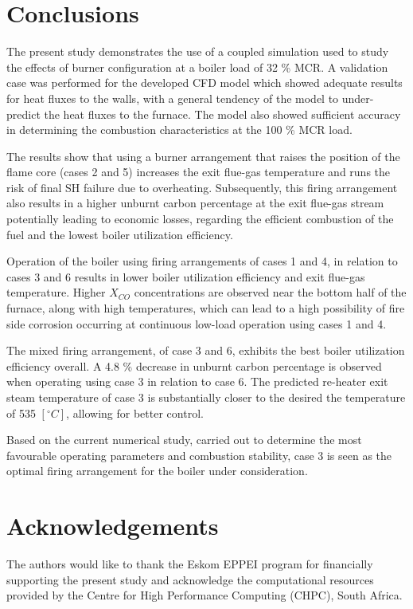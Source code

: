 \documentclass[review]{elsarticle}
\begin{document}
\clearpage
\section{Conclusions}
The present study demonstrates the use of a coupled simulation used to study the effects of burner configuration at a boiler load of 32 \% MCR. A validation case was performed for the developed CFD model which showed adequate results for heat fluxes to the walls, with a general tendency of the model to under-predict the heat fluxes to the furnace. The model also showed sufficient accuracy in determining the combustion characteristics at the 100 \% MCR load. 

The results show that using a burner arrangement that raises the position of the flame core (cases 2 and 5) increases the exit flue-gas temperature and runs the risk of final SH failure due to overheating. Subsequently, this firing arrangement also results in a higher unburnt carbon percentage at the exit flue-gas stream potentially leading to economic losses, regarding the efficient combustion of the fuel and the lowest boiler utilization efficiency.

Operation of the boiler using firing arrangements of cases 1 and 4, in relation to cases 3 and 6 results in lower boiler utilization efficiency and exit flue-gas temperature. Higher $X_{CO}$ concentrations are observed near the bottom half of the furnace, along with high temperatures, which can lead to a high possibility of fire side corrosion occurring at continuous low-load operation using cases 1 and 4.

The mixed firing arrangement, of case 3 and 6, exhibits the best boiler utilization efficiency overall. A 4.8 \% decrease in unburnt carbon percentage is observed when operating using case 3 in relation to case 6. The predicted re-heater exit steam temperature of case 3 is substantially closer to the desired the temperature of 535 $[^\circ C]$, allowing for better control. 

Based on the current numerical study, carried out to determine the most favourable operating parameters and combustion stability, case 3 is seen as the optimal firing arrangement for the boiler under consideration.

\section*{Acknowledgements}
The authors would like to thank the Eskom EPPEI program for financially supporting the present study and acknowledge the computational resources provided by the Centre for High Performance Computing (CHPC), South Africa.


\end{document}
